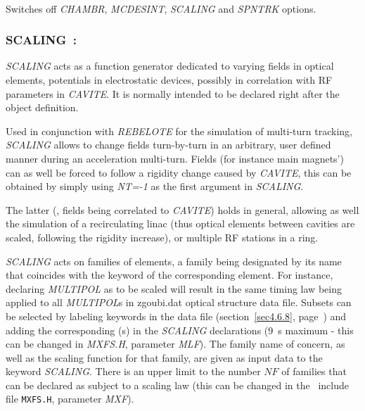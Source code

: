 {~

 \noindent Switches off \textsl{CHAMBR}, \textsl{MCDESINT}, \textsl{SCALING} and 
 \textsl{SPNTRK} options. 






 \newpage

\subsubsection{SCALING~: \SCALINGTitl} \label{SCALING}  
\medskip 
{}

\textsl{SCALING} acts as a function generator dedicated to varying 
fields in optical elements, potentials in 
electrostatic devices, possibly in correlation with RF parameters in \textsl{CAVITE}. It is normally intended
to be declared right after the object definition.

\bigskip

\noindent Used in conjunction with \textsl{REBELOTE} for the simulation of multi-turn tracking, 
 \textsl{SCALING} allows to change fields turn-by-turn in an arbitrary, user defined manner during an acceleration multi-turn. 
Fields (for instance main magnets') can as well be forced to follow a rigidity change caused by \textsl{CAVITE}, 
 this can be obtained by simply using \textsl{NT=-1} as the first argument in \textsl{SCALING}. 

\bigskip

\noindent The latter (\ie, fields being correlated to \textsl{CAVITE}) holds in general, 
allowing as well the simulation of a recirculating linac (thus optical elements between cavities 
are scaled, following the rigidity increase), or multiple RF stations in a ring. 

\bigskip

\noindent\textsl{SCALING} acts on families of elements,  a family being
designated by its name that  coincides with 
the keyword of the corresponding element. For instance, declaring \textsl{MULTIPOL} 
as to be scaled will result in the same timing law being applied to all 
\textsl{MULTIPOL}s in zgoubi.dat optical structure data file. Subsets can be selected by 
labeling keywords in the data file (section~\ref{sec4.6.8}, page~\pageref{sec4.6.8}) 
and adding the corresponding \LABEL(s) 
in the \textsl{SCALING} declarations (9~\LABEL s maximum - this can be changed in \textsl{MXFS.H}, parameter \textsl{MLF}). 
The family name of concern, as well as the scaling function for  that  family,  are given as
input data to the keyword \textsl{SCALING}. There is an upper limit to the number  $NF$ 
of families that can be declared
as subject to a scaling law (this can be changed in the \FORTRAN\ include file \texttt{MXFS.H}, parameter \textsl{MXF}). 

}
